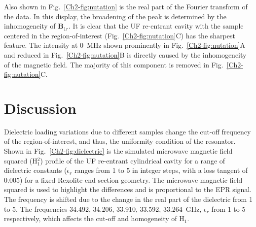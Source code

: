 Also shown in Fig.~\ref{Ch2-fig:nutation} is the real part of the Fourier transform of the data. In this display, the broadening of the peak is determined by the inhomogeneity of $\mathbf{B}_{1r}$. \cite{pulsejeschke} It is clear that the UF re-entrant \cylTE{} cavity with the sample centered in the region-of-interest (Fig.~\ref{Ch2-fig:nutation}C) has the sharpest feature. The intensity at 0~MHz shown prominently in Fig.~\ref{Ch2-fig:nutation}A and reduced in Fig.~\ref{Ch2-fig:nutation}B is directly caused by the inhomogeneity of the magnetic field. The majority of this component is removed in Fig.~\ref{Ch2-fig:nutation}C. 

\section{Discussion}

Dielectric loading variations due to different samples change the cut-off frequency of the region-of-interest, and thus, the uniformity condition of the resonator. Shown in Fig.~\ref{Ch2-fig:dielectric} is the simulated microwave magnetic field squared (H$^2_1$) profile of the UF re-entrant cylindrical \cylTE{} cavity for a range of dielectric constants ($\epsilon_r$ ranges from 1 to 5 in integer steps, with a loss tangent of 0.005) for a fixed Rexolite end section geometry. The microwave magnetic field squared is used to highlight the differences and is proportional to the EPR signal. The frequency is shifted due to the change in the real part of the dielectric from 1 to 5. The frequencies  34.492, 34.206, 33.910, 33.592, 33.264~GHz, $\epsilon_r$ from 1 to 5 respectively, which affects the cut-off and homogeneity of H$_1$. 

